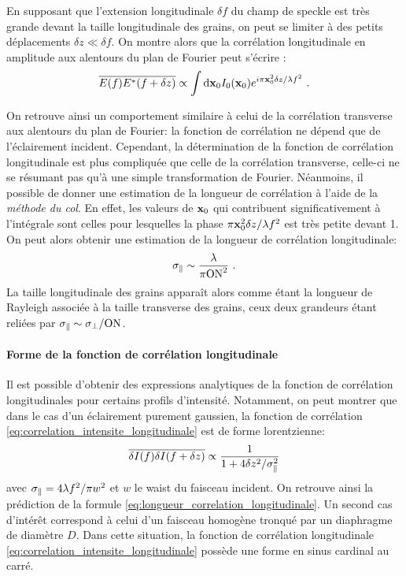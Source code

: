 En supposant que l'extension longitudinale $\delta f$ du champ de speckle est très grande devant la taille longitudinale des grains, on peut se limiter à des petits déplacements $\delta z \ll \delta f$. On montre alors que la corrélation longitudinale en amplitude aux alentours du plan de Fourier peut s'écrire \citep{magatti2009three}:
\begin{equation}
\overline{E(f)E^*(f+\delta z)} \propto \int{\mathrm{d} \mathbf{x}_0I_0 (\mathbf{x}_0) e^{i\pi \mathbf{x}_0^2 \delta z / \lambda f^2} } \text{ .}
\label{eq:correlation_longitudinale_1_speckle}
\end{equation}

On retrouve ainsi un comportement similaire à celui de la corrélation transverse aux alentours du plan de Fourier: la fonction de corrélation ne dépend que de l'éclairement incident. Cependant, la détermination de la fonction de corrélation longitudinale est plus compliquée que celle de la corrélation transverse, celle-ci ne se résumant pas qu'à une simple transformation de Fourier. Néanmoins, il possible de donner une estimation de la longueur de corrélation à l'aide de la \emph{méthode du col}. En effet, les valeurs de $\mathbf{x}_0$ qui contribuent significativement à l'intégrale sont celles pour lesquelles la phase $\pi \mathbf{x}_0^2 \delta z /\lambda f^2$ est très petite devant 1. On peut alors obtenir une estimation de la longueur de corrélation longitudinale:
\begin{equation}
\sigma_{\parallel} \sim \frac{\lambda }{ \pi \mathrm{ON}^2} \text{ .}
\label{eq:longueur_correlation_longitudinale}
\end{equation}
La taille longitudinale des grains apparaît alors comme étant la longueur de Rayleigh associée à la taille transverse des grains, ceux deux grandeurs étant reliées par $\sigma_{\parallel} \sim \sigma_{\perp} /\mathrm{ON}$.







\paragraph*{Forme de la fonction de corrélation longitudinale}

Il est possible d'obtenir des expressions analytiques de la fonction de corrélation longitudinales pour certains profils d'intensité. Notamment, on peut montrer que dans le cas d'un éclairement purement gaussien, la fonction de corrélation \ref{eq:correlation_intensite_longitudinale} est de forme lorentzienne:
\begin{equation}
\overline{\delta I(f) \delta I(f+\delta z)} \propto \frac{1}{1+4\delta z^2/\sigma_{\parallel}^2}
\end{equation}
avec $\sigma_{\parallel}=4\lambda f^2/\pi w^2$ et $w$ le waist du faisceau incident. On retrouve ainsi la prédiction de la formule \ref{eq:longueur_correlation_longitudinale}. Un second cas d'intérêt correspond à celui d'un faisceau homogène tronqué par un diaphragme de diamètre $D$. Dans cette situation, la fonction de corrélation longitudinale \ref{eq:correlation_intensite_longitudinale} possède une forme en sinus cardinal au carré.


